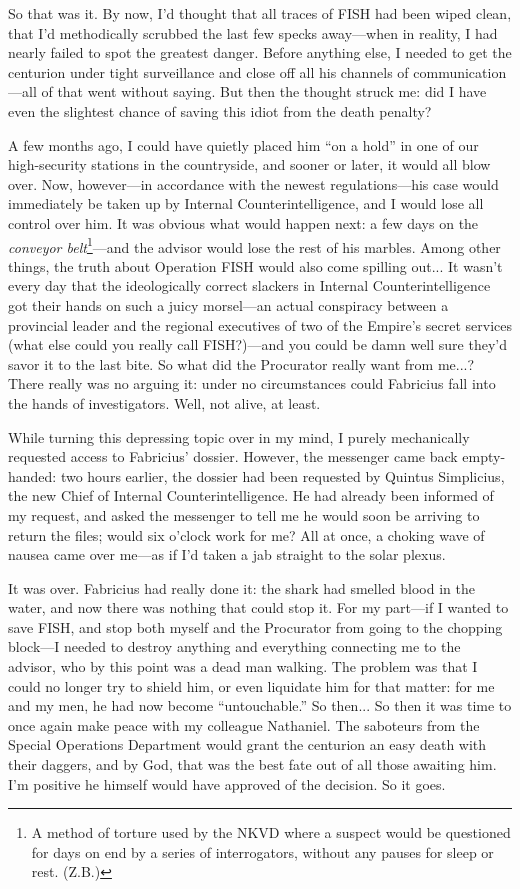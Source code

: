 So that was it. By now, I'd thought that all traces of FISH had been wiped clean, that I'd methodically scrubbed the last few specks away---when in reality, I had nearly failed to spot the greatest danger. Before anything else, I needed to get the centurion under tight surveillance and close off all his channels of communication---all of that went without saying. But then the thought struck me: did I have even the slightest chance of saving this idiot from the death penalty?

A few months ago, I could have quietly placed him ``on a hold'' in one of our high-security stations in the countryside, and sooner or later, it would all blow over. Now, however---in accordance with the newest regulations---his case would immediately be taken up by Internal Counterintelligence, and I would lose all control over him. It was obvious what would happen next: a few days on the \emph{conveyor belt}\footnote{A method of torture used by the NKVD where a suspect would be questioned for days on end by a series of interrogators, without any pauses for sleep or rest. (Z.B.)}---and the advisor would lose the rest of his marbles. Among other things, the truth about Operation FISH would also come spilling out... It wasn't every day that the ideologically correct slackers in Internal Counterintelligence got their hands on such a juicy morsel---an actual conspiracy between a provincial leader and the regional executives of two of the Empire's secret services (what else could you really call FISH?)---and you could be damn well sure they'd savor it to the last bite. So what did the Procurator really want from me...? There really was no arguing it: under no circumstances could Fabricius fall into the hands of investigators. Well, not alive, at least.

While turning this depressing topic over in my mind, I purely mechanically requested access to Fabricius' dossier. However, the messenger came back empty-handed: two hours earlier, the dossier had been requested by Quintus Simplicius, the new Chief of Internal Counterintelligence. He had already been informed of my request, and asked the messenger to tell me he would soon be arriving to return the files; would six o'clock work for me? All at once, a choking wave of nausea came over me---as if I'd taken a jab straight to the solar plexus. 

It was over. Fabricius had really done it: the shark had smelled blood in the water, and now there was nothing that could stop it. For my part---if I wanted to save FISH, and stop both myself and the Procurator from going to the chopping block---I needed to destroy anything and everything connecting me to the advisor, who by this point was a dead man walking. The problem was that I could no longer try to shield him, or even liquidate him for that matter: for me and my men, he had now become ``untouchable.'' So then... So then it was time to once again make peace with my colleague Nathaniel. The saboteurs from the Special Operations Department would grant the centurion an easy death with their daggers, and by God, that was the best fate out of all those awaiting him. I'm positive he himself would have approved of the decision. So it goes.

